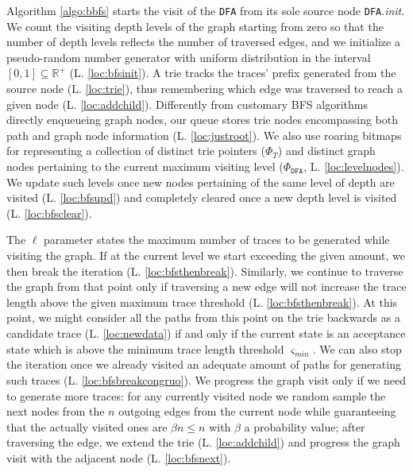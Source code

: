\documentclass[sigconf]{acmart}
\newcommand{\smin}{\ensuremath{\varsigma_\textit{min}}}
\begin{document}
Algorithm \ref{algo:bbfs} starts the visit of the \texttt{DFA} from its sole source node \texttt{DFA}.\textit{init}. We count the visiting depth levels of the graph starting from zero so that the number of depth levels reflects the number of traversed edges, and we initialize a pseudo-random number generator with uniform distribution in the interval $[0,1 ]\subseteq\mathbb{R}^+$ (L. \ref{loc:bfsinit}). A trie tracks the traces' prefix  generated from the source node (L. \ref{loc:trie}), thus remembering which edge was traversed to reach a given node (L. \ref{loc:addchild}). Differently from customary BFS algorithms directly enqueueing graph nodes, our queue  stores trie nodes encompassing both path and graph node information (L. \ref{loc:justroot}). We also use roaring bitmaps \cite{WangLPS17} for representing a collection of distinct trie pointers ($\Phi_T$) and distinct graph nodes pertaining to the current maximum visiting level ($\Phi_\texttt{DFA}$, L. \ref{loc:levelnodes}). We update such levels once new nodes pertaining of the same level of depth are visited (L. \ref{loc:bfsupd}) and completely cleared once a new depth level is visited (L. \ref{loc:bfsclear}). 

The $\ell$ parameter states the maximum number of traces to be generated while visiting the graph. If at the current level we start exceeding the given amount, we then break the iteration (L. \ref{loc:bfsthenbreak}). Similarly, we continue to traverse the graph from that point only if traversing a new edge will not increase the trace length above the given maximum trace threshold (L. \ref{loc:bfsthenbreak}). At this point, we might consider all the paths from this point on the trie backwards as a candidate trace (L. \ref{loc:newdata}) if and only if the current state is an acceptance state which is above the minimum trace length threshold $\smin$. We can also stop the iteration once we already visited an adequate amount of paths for generating such traces (L. \ref{loc:bfsbreakcongruo}). We progress the graph visit only if we need to generate more traces: for any currently visited node we random sample the next nodes from the $n$ outgoing edges from the current node while guaranteeing that the actually visited ones are $\beta n\leq n$ with $\beta$ a probability value; after traversing the edge, we extend the trie (L. \ref{loc:addchild}) and progress the graph visit with the adjacent node (L. \ref{loc:bfsnext}). 
\end{document}
